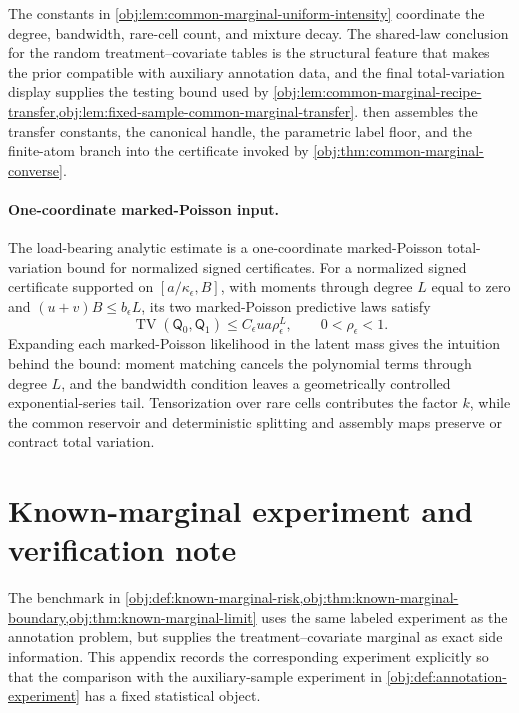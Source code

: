 \documentclass[11pt]{article}
\begin{document}
The constants in \cref{obj:lem:common-marginal-uniform-intensity} coordinate the degree, bandwidth, rare-cell count, and mixture decay. The shared-law conclusion for the random treatment--covariate tables is the structural feature that makes the prior compatible with auxiliary annotation data, and the final total-variation display supplies the testing bound used by \cref{obj:lem:common-marginal-recipe-transfer,obj:lem:fixed-sample-common-marginal-transfer}.  then assembles the transfer constants, the canonical handle, the parametric label floor, and the finite-atom branch into the certificate invoked by \cref{obj:thm:common-marginal-converse}.

\paragraph{One-coordinate marked-Poisson input.}
The load-bearing analytic estimate is a one-coordinate marked-Poisson total-variation bound for normalized signed certificates. For a normalized signed certificate supported on \([a/\kappa_\epsilon,B]\), with moments through degree \(L\) equal to zero and \((u+v)B\le b_\epsilon L\), its two marked-Poisson predictive laws satisfy
\[
\operatorname{TV}(\mathsf Q_0,\mathsf Q_1)
\le C_\epsilon u a\rho_\epsilon^L,
\qquad 0<\rho_\epsilon<1.
\]
Expanding each marked-Poisson likelihood in the latent mass gives the intuition behind the bound: moment matching cancels the polynomial terms through degree \(L\), and the bandwidth condition leaves a geometrically controlled exponential-series tail. Tensorization over rare cells contributes the factor \(k\), while the common reservoir and deterministic splitting and assembly maps preserve or contract total variation.


\section{Known-marginal experiment and verification note}\label{sec:appendix-known}

The benchmark in \cref{obj:def:known-marginal-risk,obj:thm:known-marginal-boundary,obj:thm:known-marginal-limit} uses the same labeled experiment as the annotation problem, but supplies the treatment--covariate marginal as exact side information. This appendix records the corresponding experiment explicitly so that the comparison with the auxiliary-sample experiment in \cref{obj:def:annotation-experiment} has a fixed statistical object.
\end{document}
